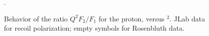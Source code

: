 \begin{figure}
\begin{center}
\caption{Behavior of the ratio $Q^2F_2/F_1$ for the proton, versus $^2$. JLab data for recoil polarization; empty symbols for Rosenbluth data. }.
\label{fig:q2f2f1p}
\end{center}
\end{figure}

